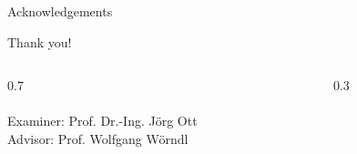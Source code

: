 
\begin{frame}{Acknowledgements}
    \vspace{4mm}
    \begin{center}
        \Huge \textcolor{TUMBlue}{Thank you!}
    \end{center}
    \begin{columns}
        \begin{column}{0.7\textwidth}
            \LARGE
            \vspace{2mm}\\
            \theChairName\\
            \vspace{5mm}
            Examiner: Prof. Dr.-Ing. Jörg Ott\\
            Advisor: Prof. Wolfgang Wörndl
        \end{column}
        \begin{column}{0.3\textwidth}
        \end{column}
    \end{columns}
\end{frame}
